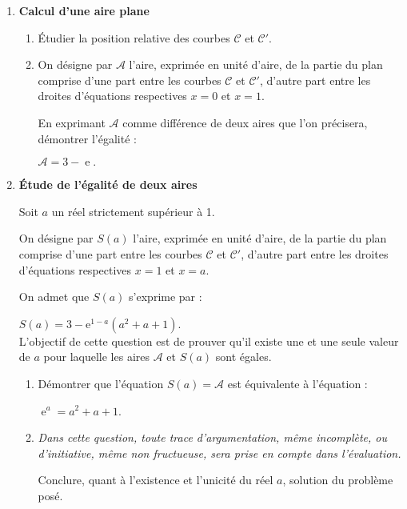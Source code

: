 \documentclass[12pt,a4paper,french]{article}
\DeclareMathOperator{\e}{e}
\newcommand{\brm}[1]{\marginpar{\addpoints{#1}}}%
\begin{document}
\begin{question}
\begin{enumerate}
\item \textbf{Calcul d'une aire plane}


	\begin{enumerate}
		\item Étudier la position relative des courbes $\mathcal{C}$ et $\mathcal{C}'$. \brm{0.5}
		\item On désigne par $\mathcal{A}$ l'aire, exprimée en unité d'aire, de la partie du plan comprise d'une part entre les courbes $\mathcal{C}$ et $\mathcal{C}'$, d'autre part entre les droites d'équations respectives $x = 0$ et $x = 1$. \brm{1}
		
En exprimant $\mathcal{A}$ comme différence de deux aires que l'on précisera, démontrer l'égalité :

$\mathcal{A} = 3 - \e.$
	\end{enumerate}

\pagebreak

\item \textbf{Étude de l'égalité de deux aires}

Soit $a$ un réel strictement supérieur à  1.

On désigne par $S(a)$ l'aire, exprimée en unité d'aire, de la partie du plan comprise d'une part entre les courbes $\mathcal{C}$ et $\mathcal{C}'$, d'autre part entre les droites d'équations respectives $x = 1$ et $x = a$.

On admet que $S(a)$ s'exprime par :

$S(a) = 3 - \text{e}^{1 - a}\left(a^2 + a + 1\right)$.\\

L'objectif de cette question est de prouver qu'il existe une et une seule valeur de $a$ pour laquelle les aires $\mathcal{A}$ et $S(a)$ sont égales.


	\begin{enumerate}
		\item Démontrer que l'équation $S(a) = \mathcal{A}$ est équivalente \`a  l'équation :
		
$\e^a = a^2 + a + 1$. \brm{0.5}
		\item \emph{Dans cette question, toute trace d'argumentation, même incomplète, ou d'initiative, même non fructueuse, sera prise en compte dans l'évaluation.}
		
Conclure, quant à l'existence et l'unicité du réel $a$, solution du problème posé. \brm{0.75}
	\end{enumerate}
\end{enumerate}
\end{question}
\end{document}
